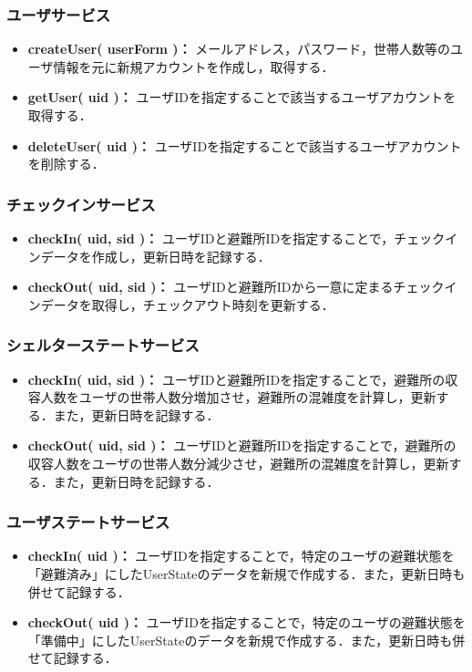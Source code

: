 \documentclass[technicalreport,dvipdfmx]{ieicej}
\begin{document}
\subsubsection{ユーザサービス}
\begin{itemize}
    \item{\textbf{createUser( userForm )：}
         メールアドレス，パスワード，世帯人数等のユーザ情報を元に新規アカウントを作成し，取得する．}
    \item{\textbf{getUser( uid )：}
         ユーザIDを指定することで該当するユーザアカウントを取得する．}
    \item{\textbf{deleteUser( uid )：}
         ユーザIDを指定することで該当するユーザアカウントを削除する．}
\end{itemize}

\subsubsection{チェックインサービス}
\begin{itemize}
    \item{\textbf{checkIn( uid, sid )：}
         ユーザIDと避難所IDを指定することで，チェックインデータを作成し，更新日時を記録する．}
    \item{\textbf{checkOut( uid, sid )：}
         ユーザIDと避難所IDから一意に定まるチェックインデータを取得し，チェックアウト時刻を更新する．}
\end{itemize}

\subsubsection{シェルターステートサービス}
\begin{itemize}
     \item{\textbf{checkIn( uid, sid )：}
          ユーザIDと避難所IDを指定することで，避難所の収容人数をユーザの世帯人数分増加させ，避難所の混雑度を計算し，更新する．また，更新日時を記録する．}
     \item{\textbf{checkOut( uid, sid )：}
          ユーザIDと避難所IDを指定することで，避難所の収容人数をユーザの世帯人数分減少させ，避難所の混雑度を計算し，更新する．また，更新日時を記録する．}
\end{itemize}

\subsubsection{ユーザステートサービス}
\begin{itemize}
     \item{\textbf{checkIn( uid )：}
          ユーザIDを指定することで，特定のユーザの避難状態を「避難済み」にしたUserStateのデータを新規で作成する．また，更新日時も併せて記録する．}
     \item{\textbf{checkOut( uid )：}
          ユーザIDを指定することで，特定のユーザの避難状態を「準備中」にしたUserStateのデータを新規で作成する．また，更新日時も併せて記録する．}
\end{itemize}
\end{document}
